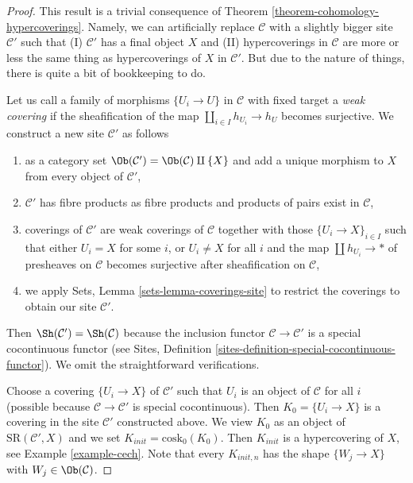 \begin{proof}
This result is a trivial consequence of
Theorem \ref{theorem-cohomology-hypercoverings}.
Namely, we can artificially replace $\mathcal{C}$ with a slightly
bigger site $\mathcal{C}'$ such that
(I) $\mathcal{C}'$ has a final object $X$ and (II)
hypercoverings in $\mathcal{C}$ are more or less the
same thing as hypercoverings of $X$ in $\mathcal{C}'$.
But due to the nature of things, there is quite a bit of
bookkeeping to do.

\medskip\noindent
Let us call a family of morphisms $\{U_i \to U\}$ in $\mathcal{C}$
with fixed target a {\it weak covering} if the sheafification of the
map $\coprod_{i \in I} h_{U_i} \to h_U$ becomes surjective.
We construct a new site $\mathcal{C}'$ as follows
\begin{enumerate}
\item as a category set $\Ob(\mathcal{C}') = \Ob(\mathcal{C}) \amalg \{X\}$
and add a unique morphism to $X$ from every object of $\mathcal{C}'$,
\item $\mathcal{C}'$ has fibre products as fibre products and products
of pairs exist in $\mathcal{C}$,
\item coverings of $\mathcal{C}'$ are weak coverings of $\mathcal{C}$
together with those $\{U_i \to X\}_{i \in I}$ such that either $U_i = X$
for some $i$, or $U_i \not = X$ for all $i$ and the map
$\coprod h_{U_i} \to *$ of presheaves on $\mathcal{C}$ becomes
surjective after sheafification on $\mathcal{C}$,
\item we apply Sets, Lemma \ref{sets-lemma-coverings-site}
to restrict the coverings to obtain our site $\mathcal{C}'$.
\end{enumerate}
Then $\Sh(\mathcal{C}') = \Sh(\mathcal{C})$ because the inclusion
functor $\mathcal{C} \to \mathcal{C}'$ is a special cocontinuous functor
(see Sites, Definition \ref{sites-definition-special-cocontinuous-functor}).
We omit the straightforward verifications.

\medskip\noindent
Choose a covering $\{U_i \to X\}$ of $\mathcal{C}'$ such that $U_i$ is an
object of $\mathcal{C}$ for all $i$ (possible because
$\mathcal{C} \to \mathcal{C}'$ is special cocontinuous).
Then $K_0 = \{U_i \to X\}$ is a covering in the
site $\mathcal{C}'$ constructed above. We view $K_0$ as an object of
$\text{SR}(\mathcal{C}', X)$ and we set $K_{init} = \text{cosk}_0(K_0)$.
Then $K_{init}$ is a hypercovering of $X$, see
Example \ref{example-cech}. Note that every $K_{init, n}$ has the shape
$\{W_j \to X\}$ with $W_j \in \Ob(\mathcal{C})$.


\end{proof}
